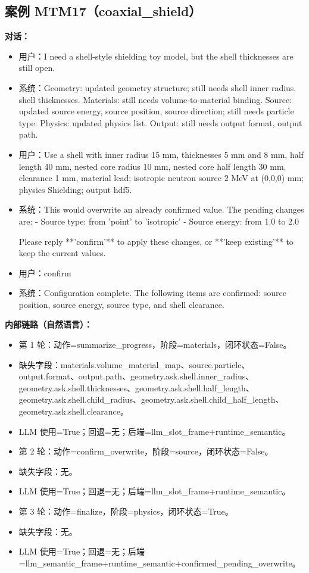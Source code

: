 \documentclass[11pt]{ctexart}
\begin{document}
\subsection{案例 MTM17（coaxial\_shield）}
\textbf{对话：}
\begin{itemize}
\item 用户：I need a shell-style shielding toy model, but the shell thicknesses are still open.
\item 系统：Geometry: updated geometry structure; still needs shell inner radius, shell thicknesses. Materials: still needs volume-to-material binding. Source: updated source energy, source position, source direction; still needs particle type. Physics: updated physics list. Output: still needs output format, output path.
\item 用户：Use a shell with inner radius 15 mm, thicknesses 5 mm and 8 mm, half length 40 mm, nested core radius 10 mm, nested core half length 30 mm, clearance 1 mm, material lead; isotropic neutron source 2 MeV at (0,0,0) mm; physics Shielding; output hdf5.
\item 系统：This would overwrite an already confirmed value. The pending changes are:
- Source type: from 'point' to 'isotropic'
- Source energy: from 1.0 to 2.0

Please reply **'confirm'** to apply these changes, or **'keep existing'** to keep the current values.
\item 用户：confirm
\item 系统：Configuration complete. The following items are confirmed: source position, source energy, source type, and shell clearance.
\end{itemize}
\textbf{内部链路（自然语言）：}
\begin{itemize}
\item 第 1 轮：动作=summarize\_progress，阶段=materials，闭环状态=False。
\item 缺失字段：materials.volume\_material\_map、source.particle、output.format、output.path、geometry.ask.shell.inner\_radius、geometry.ask.shell.thicknesses、geometry.ask.shell.half\_length、geometry.ask.shell.child\_radius、geometry.ask.shell.child\_half\_length、geometry.ask.shell.clearance。
\item LLM 使用=True；回退=无；后端=llm\_slot\_frame+runtime\_semantic。
\item 第 2 轮：动作=confirm\_overwrite，阶段=source，闭环状态=False。
\item 缺失字段：无。
\item LLM 使用=True；回退=无；后端=llm\_slot\_frame+runtime\_semantic。
\item 第 3 轮：动作=finalize，阶段=physics，闭环状态=True。
\item 缺失字段：无。
\item LLM 使用=True；回退=无；后端=llm\_semantic\_frame+runtime\_semantic+confirmed\_pending\_overwrite。
\end{itemize}
\end{document}
